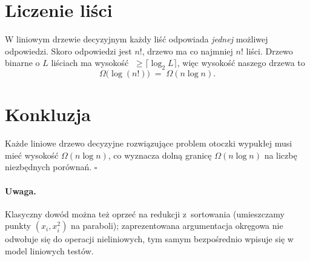 \documentclass[11pt,a4paper]{article}
\begin{document}
\section*{Liczenie liści}

W liniowym drzewie decyzyjnym każdy
liść odpowiada \emph{jednej} możliwej odpowiedzi.
Skoro odpowiedzi jest $n!$, drzewo ma
co najmniej $n!$ liści.
Drzewo binarne o $L$ liściach ma wysokość
$\;\ge\lceil\log_2 L\rceil$,
więc wysokość naszego drzewa to
\[
  \Omega\!\bigl(\log (n!)\bigr)
  \;=\;
  \Omega(n\log n).
\]

\section*{Konkluzja}

Każde liniowe drzewo decyzyjne
rozwiązujące problem otoczki wypukłej
musi mieć wysokość 
$\Omega(n\log n)$,
co wyznacza dolną granicę
\(
  \Omega(n\log n)
\)
na liczbę niezbędnych porównań.
\hfill$\square$

\paragraph{Uwaga.}
Klasyczny dowód można też oprzeć
na redukcji z~sortowania
(umieszczamy punkty $(x_i,x_i^2)$ na paraboli);
zaprezentowana argumentacja okręgowa
nie odwołuje się do operacji nieliniowych,
tym samym bezpośrednio wpisuje się
w model liniowych testów.
\end{document}

